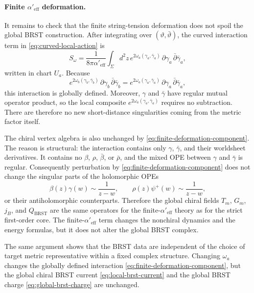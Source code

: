 \documentclass[11pt]{article}
\newcommand{\Aeff}{\alpha'_{\mathrm{eff}}}
\begin{document}
\paragraph{Finite $\Aeff$ deformation.}
It remains to check that the finite string-tension deformation does not spoil the global BRST construction. After integrating over $(\vartheta,\bar\vartheta)$, the curved interaction term in \eqref{eq:curved-local-action} is
\begin{equation}\label{eq:finite-deformation-component}
S_{\omega}
=
\frac{1}{8\pi\Aeff}\int_\Sigma d^2z\,
e^{2\omega_a(\gamma_a,\bar\gamma_a)}\,\partial\gamma_a\,\bar\partial\bar\gamma_a,
\end{equation}
written in chart $U_a$. Because
\begin{equation}\label{eq:interaction-patching}
e^{2\omega_b(\gamma_b,\bar\gamma_b)}\,
\partial\gamma_b\,\bar\partial\bar\gamma_b
=
e^{2\omega_a(\gamma_a,\bar\gamma_a)}\,
\partial\gamma_a\,\bar\partial\bar\gamma_a,
\end{equation}
this interaction is globally defined. Moreover, $\gamma$ and $\bar\gamma$ have regular mutual operator product, so the local composite $e^{2\omega_a(\gamma_a,\bar\gamma_a)}$ requires no subtraction. There are therefore no new short-distance singularities coming from the metric factor itself.

The chiral vertex algebra is also unchanged by \eqref{eq:finite-deformation-component}. The reason is structural: the interaction contains only $\gamma$, $\bar\gamma$, and their worldsheet derivatives. It contains no $\beta$, $\rho$, $\bar\beta$, or $\bar\rho$, and the mixed OPE between $\gamma$ and $\bar\gamma$ is regular. Consequently perturbation by \eqref{eq:finite-deformation-component} does not change the singular parts of the holomorphic OPEs
\begin{equation}\label{eq:chiral-opes-unchanged}
\beta(z)\gamma(w)\sim \frac{1}{z-w},
\qquad
\rho(z)\psi^+(w)\sim \frac{1}{z-w},
\end{equation}
or their antiholomorphic counterparts. Therefore the global chiral fields $T_m$, $G_m$, $j_B$, and $Q_{\mathrm{BRST}}$ are the same operators for the finite-$\Aeff$ theory as for the strict first-order core. The finite-$\Aeff$ term changes the nonchiral dynamics and the energy formulas, but it does not alter the global BRST complex.

The same argument shows that the BRST data are independent of the choice of target metric representative within a fixed complex structure. Changing $\omega_a$ changes the globally defined interaction \eqref{eq:finite-deformation-component}, but the global chiral BRST current \eqref{eq:local-brst-current} and the global BRST charge \eqref{eq:global-brst-charge} are unchanged.
\end{document}
